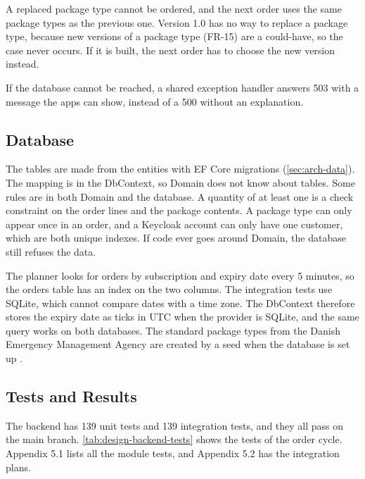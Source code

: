 A replaced package type cannot be ordered, and the next order uses the same package
types as the previous one. Version 1.0 has no way to replace a package type, because
new versions of a package type (FR-15) are a could-have, so the case never occurs. If it
is built, the next order has to choose the new version instead.

If the database cannot be reached, a shared exception handler answers 503 with a
message the apps can show, instead of a 500 without an explanation.

\subsection{Database}

The tables are made from the entities with EF Core migrations
(\autoref{sec:arch-data}). The mapping is in the DbContext, so Domain does not know about
tables. Some rules are in both Domain and the database. A quantity of at least one is a
check constraint on the order lines and the package contents. A package type can only
appear once in an order, and a Keycloak account can only have one customer, which
are both unique indexes. If code ever goes around Domain, the database still refuses
the data.

The planner looks for orders by subscription and expiry date every 5 minutes, so the
orders table has an index on the two columns. The integration tests use SQLite, which
cannot compare dates with a time zone. The DbContext therefore stores the expiry date as
ticks in UTC when the provider is SQLite, and the same query works on both databases.
The standard package types from the Danish Emergency Management Agency are created
by a seed when the database is set up \cite{brs-forberedt}.

\subsection{Tests and Results}

The backend has 139 unit tests and 139 integration tests, and they all pass on the main
branch. \autoref{tab:design-backend-tests} shows the tests of the order cycle. Appendix
5.1 lists all the module tests, and Appendix 5.2 has the integration plans.

